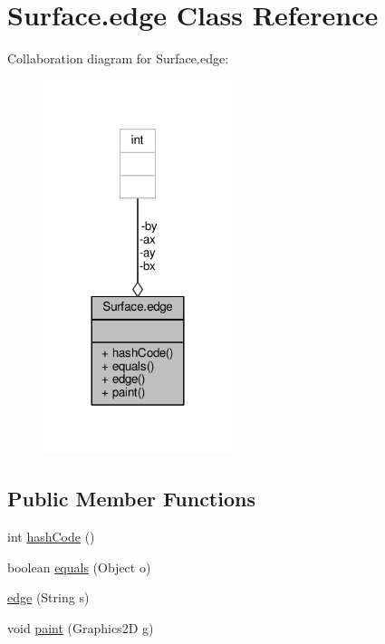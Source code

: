 \hypertarget{classSurface_1_1edge}{\section{Surface.\-edge Class Reference}
\label{classSurface_1_1edge}
}


Collaboration diagram for Surface.\-edge\-:
\nopagebreak
\begin{figure}[H]
\begin{center}
\leavevmode
\includegraphics[width=156pt]{classSurface_1_1edge__coll__graph}
\end{center}
\end{figure}
\subsection*{Public Member Functions}
\begin{DoxyCompactItemize}
\item 
int \hyperlink{classSurface_1_1edge_a6598870e2d576caf562fb8056841837e}{hash\-Code} ()
\item 
boolean \hyperlink{classSurface_1_1edge_a5844ec8a6a367ce9d02380d747913f1e}{equals} (Object o)
\item 
\hyperlink{classSurface_1_1edge_a44566140c05c93eca09e9d28c1367c21}{edge} (String s)
\item 
void \hyperlink{classSurface_1_1edge_ab90affbc78ce2173f0b24fdf7253e804}{paint} (Graphics2\-D g)
\end{DoxyCompactItemize}

